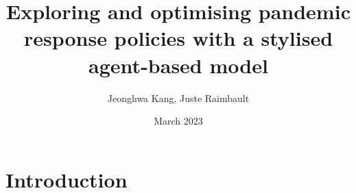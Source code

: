 \documentclass{article}
\title{Exploring and optimising pandemic response policies with a stylised agent-based model}
\author{Jeonghwa Kang, Juste Raimbault}
\date{March 2023}
\begin{document}
\maketitle





\section{Introduction}
\end{document}
